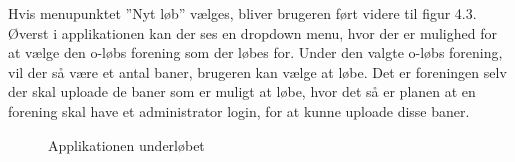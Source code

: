 Hvis menupunktet ”Nyt løb” vælges, bliver brugeren ført videre til figur 4.3. Øverst i applikationen kan der ses en dropdown menu, hvor der er mulighed for at vælge den o-løbs forening som der løbes for. Under den valgte o-løbs forening, vil der så være et antal baner, brugeren kan vælge at løbe. Det er foreningen selv der skal uploade de baner som er muligt at løbe, hvor det så er planen at en forening skal have et administrator login, for at kunne uploade disse baner.

\begin{figure}
	\centering
	\begin{minipage}{.5\textwidth}
		\centering
		\caption{Applikationen underløbet}
		\label{fig:test1}
	\end{minipage}%
	\begin{minipage}{.5\textwidth}
		\centering

\end{minipage}
\end{figure}
